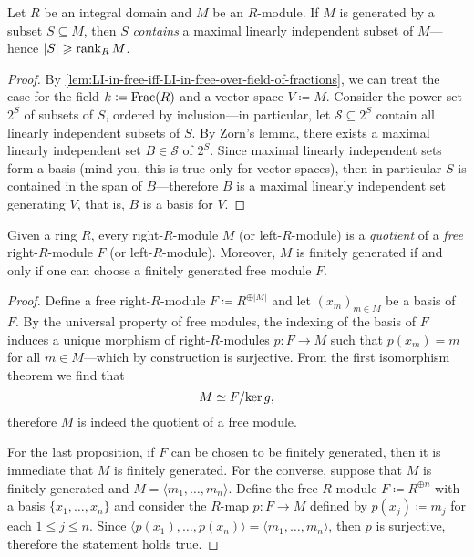 \begin{proposition}
    \label{prop:generating-set-contains-maximal-LI}
    Let \(R\) be an integral domain and \(M\) be an \(R\)-module. If \(M\) is
    generated by a subset \(S \subseteq M\), then \(S\) \emph{contains} a maximal
    linearly independent subset of \(M\)---hence \(|S| \geqslant \operatorname{rank}_R M\).
\end{proposition}

\begin{proof}
    By \cref{lem:LI-in-free-iff-LI-in-free-over-field-of-fractions}, we can treat
    the case for the field \(k \coloneq \operatorname{Frac}(R)\) and a vector space
    \(V \coloneq M\). Consider the power set \(2^S\) of subsets of \(S\), ordered by
    inclusion---in particular, let \(\mathcal{S} \subseteq 2^S\) contain all
    linearly independent subsets of \(S\). By Zorn's lemma, there exists a maximal
    linearly independent set \(B \in \mathcal{S}\) of \(2^S\). Since maximal
    linearly independent sets form a basis (mind you, this is true only for vector
    spaces), then in particular \(S\) is contained in the span of \(B\)---therefore
    \(B\) is a maximal linearly independent set generating \(V\), that is, \(B\) is
    a basis for \(V\).
\end{proof}

\begin{theorem}
    \label{thm:any-module-is-quotient-of-free-module}
    Given a ring \(R\), every right-\(R\)-module \(M\) (or left-\(R\)-module) is a
    \emph{quotient} of a \emph{free} right-\(R\)-module \(F\) (or
    left-\(R\)-module). Moreover, \(M\) is finitely generated if and only if one can
    choose a finitely generated free module \(F\).
\end{theorem}

\begin{proof}
    Define a free right-\(R\)-module \(F \coloneq R^{\oplus |M|}\) and let
    \((x_m)_{m \in M}\) be a basis of \(F\). By the universal property of
    free modules, the indexing of the basis of \(F\) induces a unique morphism of
    right-\(R\)-modules \(p: F \to M\) such that \(p(x_m) = m\) for all \(m \in
    M\)---which by construction is surjective. From the first isomorphism theorem we
    find that
    \[
        M \simeq F/{\ker g},
    \]
    therefore \(M\) is indeed the quotient of a free module.

    For the last proposition, if \(F\) can be chosen to be finitely generated, then
    it is immediate that \(M\) is finitely generated. For the converse, suppose that
    \(M\) is finitely generated and \(M = \langle m_1, \dots, m_n \rangle\). Define
    the free \(R\)-module \(F \coloneq R^{\oplus n}\) with a basis
    \(\{x_1, \dots, x_n\}\) and consider the \(R\)-map \(p: F \to M\) defined by
    \(p(x_j) \coloneq m_j\) for each \(1 \leq j \leq n\). Since \(\langle p(x_1),
    \dots, p(x_n) \rangle = \langle m_1, \dots, m_n \rangle\), then \(p\) is
    surjective, therefore the statement holds true.
\end{proof}

